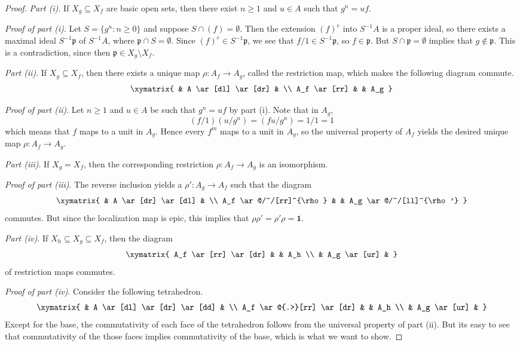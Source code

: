 \begin{proof} \mbox{}

\emph{Part (i)}. If $ X_g \subseteq X_f$ are basic open sets,
then there exist $ n \geq 1$ and $ u \in A$ such that $ g^n =
uf$.

\emph{Proof of part (i)}. Let $ S = \{g^n : n \geq 0\}$ and
suppose $ S \cap (f) = \emptyset$. Then the extension $ (f)^e$
into $ S^{-1}A$ is a proper ideal, so there exists a maximal
ideal $ S^{-1}\mathfrak{p}$ of $ S^{-1}A$, where $ \mathfrak{p}
\cap S = \emptyset$. Since $ (f)^e \in S^{-1}\mathfrak{p}$, we
see that $ f/1 \in S^{-1}\mathfrak{p}$, so $ f \in
\mathfrak{p}$. But $ S \cap \mathfrak{p} = \emptyset$ implies
that $ g \notin \mathfrak{p}$. This is a contradiction, since
then $ \mathfrak{p} \in X_g \setminus X_f$.

\emph{Part (ii)}. If $ X_g \subseteq X_f$, then there exists a
unique map $ \rho : A_f \to A_g$, called the restriction map,
which makes the following diagram commute.
\[ \xymatrix{ & A \ar[dl] \ar[dr] & \\ A_f \ar[rr] & & A_g } \]

\emph{Proof of part (ii)}. 
Let $ n \geq 1$ and $ u \in A$ be such that $ g^n = uf$ by part
(i). Note that in $ A_g$,
\[ (f/1)(u/g^n) = (fu/g^n) = 1/1 = 1 \]
which means that $ f$ maps to a unit in $ A_g$. Hence every $
f^m$ maps to a unit in $ A_g$, so the universal property of $
A_f$ yields the desired unique map $ \rho : A_f \to A_g$.

\emph{Part (iii)}. 
If $ X_g = X_f$, then the corresponding restriction $ \rho : A_f
\to A_g$ is an isomorphism.

\emph{Proof of part (iii)}. 
The reverse inclusion yields a $ \rho' : A_g \to A_f$ such that
the diagram
\[ \xymatrix{
& A \ar[dr] \ar[dl] & \\
A_f \ar@/^/[rr]^{\rho} & & A_g \ar@/^/[ll]^{\rho'}
} \]
commutes. But since the localization map is epic, this implies
that $ \rho \rho' = \rho' \rho = \mathbf{1}$.

\emph{Part (iv)}.
If $ X_h \subseteq X_g \subseteq X_f$, then the diagram
\[ \xymatrix{
A_f \ar[rr] \ar[dr] & & A_h \\
& A_g \ar[ur] &
} \]
of restriction maps commutes.

\emph{Proof of part (iv)}.
Consider the following tetrahedron.
\[ \xymatrix{
& A \ar[dl] \ar[dr] \ar[dd] & \\
A_f \ar@{.>}[rr] \ar[dr] & & A_h \\
& A_g \ar[ur] &
} \]
Except for the base, the commutativity of each face of the
tetrahedron follows from the universal property of part (ii).
But its easy to see that commutativity of the those faces
implies commutativity of the base, which is what we want to
show.


\end{proof}
